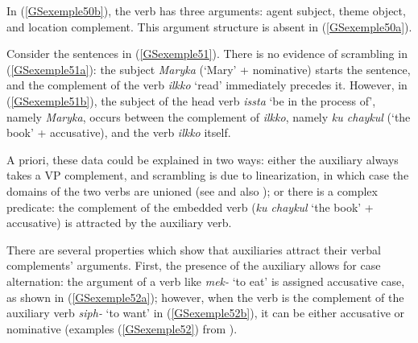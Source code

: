     \label{GSexemple50b}
\zl

\noindent
In (\ref{GSexemple50b}), the verb has three arguments: agent subject, theme object, and location complement. This argument structure is absent in (\ref{GSexemple50a}).

Consider the sentences in (\ref{GSexemple51}). There is no evidence of scrambling in (\ref{GSexemple51a}): the subject \emph{Maryka} (`Mary' + nominative) starts the sentence, and the complement of the verb \emph{ilkko} `read' immediately precedes it. However, in (\ref{GSexemple51b}), the subject of the head verb \emph{issta} `be in the process of', namely \emph{Maryka}, occurs between the complement of \emph{ilkko}, namely \emph{ku chaykul} (`the book' + accusative), and the verb \emph{ilkko} itself.
\eal
	\label{GSexemple51}
	\label{GSexemple51a}
		
	\label{GSexemple51b}

\zl

\noindent
A priori, these data could be explained in two ways: either the auxiliary always takes a VP
complement, and scrambling is due to linearization, in which case the domains of the two verbs are
unioned (see \citealt{Reape94a} and also ); or
there is a complex predicate: the complement of the embedded verb (\emph{ku chaykul} `the book' +
accusative) is attracted by the auxiliary verb.

\largerpage[2]
There are several properties which show that auxiliaries attract their verbal complements'
arguments. First, the presence of the auxiliary allows for case alternation: the argument of a verb
like \emph{mek-} `to eat' is assigned accusative case, as shown in (\ref{GSexemple52a}); however,
when the verb is the complement of the auxiliary verb \emph{siph-} `to want' in
(\ref{GSexemple52b}), it can be either accusative or nominative (examples (\ref{GSexemple52}) from
\citealt[87]{Kim2016a-u}).

